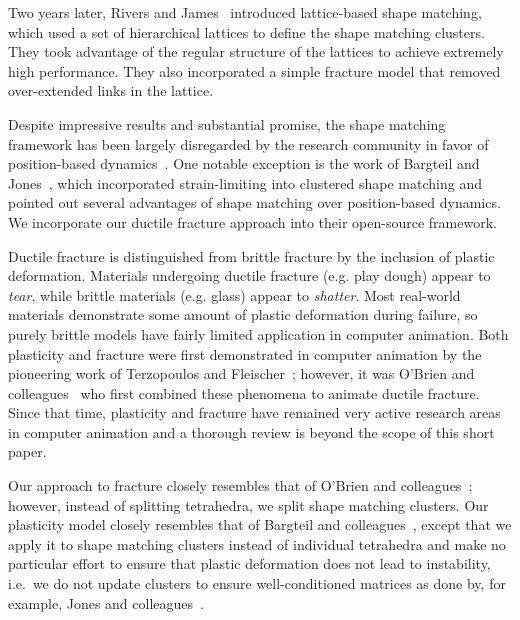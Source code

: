\documentclass[review]{acmsiggraph}
\begin{document}
Two years later, Rivers and James~ introduced lattice-based shape matching,
which used a set of hierarchical lattices to define the shape matching clusters.  They took advantage
of the regular structure of the lattices to achieve extremely high performance.  They also incorporated a 
simple fracture model that removed over-extended links in the lattice.  

Despite impressive results and substantial promise,
the shape matching framework has been largely disregarded by the research community in favor of position-based
dynamics~\cite{Mueller:2007:PBD,Bender:2013:PBM,Bender:2014:ASO,Macklin:2014:UPP}.  One notable exception is
the work of Bargteil and Jones~, which incorporated strain-limiting into clustered shape matching
and pointed out several advantages of shape matching over position-based dynamics.
We incorporate our ductile fracture approach into their open-source framework.

Ductile fracture is distinguished from brittle fracture by the inclusion of plastic deformation.  Materials undergoing ductile
fracture (e.g. play dough) appear to {\em tear}, while brittle materials (e.g. glass) appear to {\em shatter}.  Most
real-world materials demonstrate some amount of plastic deformation during failure, so purely brittle models have fairly limited
application in computer animation.  
Both plasticity and fracture
were first demonstrated in computer animation by the pioneering work of Terzopoulos and Fleischer~; 
however, it was O'Brien and colleagues~
who first combined these phenomena to animate ductile fracture.  Since that time, plasticity and fracture have
remained very active research areas in computer animation and a thorough review is beyond the scope of this short paper.

Our approach 
to fracture closely resembles that of O'Brien and colleagues~; however, instead of splitting tetrahedra,
we split shape matching clusters.  Our plasticity model closely resembles that of Bargteil and colleagues~, except that
we apply it to shape matching clusters instead of individual tetrahedra and make no particular effort to ensure that plastic deformation does not
lead to instability, i.e.~we do not update clusters to ensure well-conditioned matrices as done by, for example, Jones and colleagues~.
\end{document}
